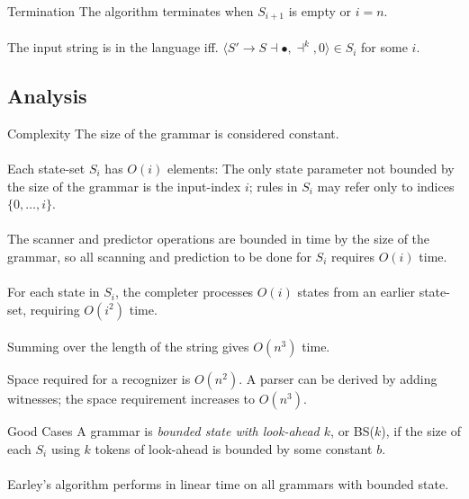 \documentclass{beamer}
\begin{document}
\begin{frame}{Termination}
  The algorithm terminates when $S_{i+1}$ is empty or $i = n$.\\~\\

  The input string is in the language iff. $\langle S' \to S \dashv \bullet, \dashv^k, 0\rangle \in S_i$ for some $i$.
\end{frame}

\subsection{Analysis}
\begin{frame}{Complexity}
  The size of the grammar is considered constant.\\~\\

  Each state-set $S_i$ has $O(i)$ elements: The only state parameter not bounded by the size of the grammar is the input-index $i$;
  rules in $S_i$ may refer only to indices $\{0, \ldots, i\}$.\\~\\

  The scanner and predictor operations are bounded in time by the size of the grammar, so all scanning and prediction to be done for $S_i$ requires $O(i)$ time.\\~\\

  For each state in $S_i$, the completer processes $O(i)$ states from an earlier state-set, requiring $O(i^2)$ time.\\~\\

  Summing over the length of the string gives $O(n^3)$ time.
\end{frame}

\begin{frame}
  Space required for a recognizer is $O(n^2)$. A parser can be derived by adding witnesses; the space requirement increases to $O(n^3)$.
\end{frame}

\begin{frame}{Good Cases}
  A grammar is {\it bounded state with look-ahead $k$}, or BS($k$), if the size of each $S_i$ using $k$ tokens of look-ahead is bounded by some constant $b$.\\~\\

  Earley's algorithm performs in linear time on all grammars with bounded state.
\end{frame}
\end{document}
